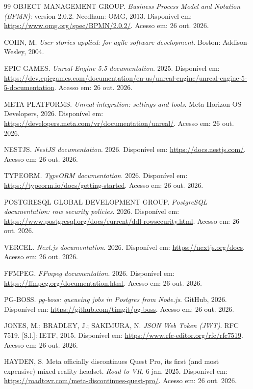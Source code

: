 \documentclass[conference,a4paper,10pt]{IEEEtran}
\begin{document}
\begin{thebibliography}{99}
 OBJECT MANAGEMENT GROUP. \textit{Business Process Model and Notation (BPMN)}: version 2.0.2. Needham: OMG, 2013. Disponível em: \url{https://www.omg.org/spec/BPMN/2.0.2/}. Acesso em: 26 out. 2026.

 COHN, M. \textit{User stories applied: for agile software development}. Boston: Addison-Wesley, 2004.

 EPIC GAMES. \textit{Unreal Engine 5.5 documentation}. 2025. Disponível em: \url{https://dev.epicgames.com/documentation/en-us/unreal-engine/unreal-engine-5-5-documentation}. Acesso em: 26 out. 2026.

 META PLATFORMS. \textit{Unreal integration: settings and tools}. Meta Horizon OS Developers, 2026. Disponível em: \url{https://developers.meta.com/vr/documentation/unreal/}. Acesso em: 26 out. 2026.

 NESTJS. \textit{NestJS documentation}. 2026. Disponível em: \url{https://docs.nestjs.com/}. Acesso em: 26 out. 2026.

 TYPEORM. \textit{TypeORM documentation}. 2026. Disponível em: \url{https://typeorm.io/docs/getting-started}. Acesso em: 26 out. 2026.

 POSTGRESQL GLOBAL DEVELOPMENT GROUP. \textit{PostgreSQL documentation: row security policies}. 2026. Disponível em: \url{https://www.postgresql.org/docs/current/ddl-rowsecurity.html}. Acesso em: 26 out. 2026.

 VERCEL. \textit{Next.js documentation}. 2026. Disponível em: \url{https://nextjs.org/docs}. Acesso em: 26 out. 2026.

 FFMPEG. \textit{FFmpeg documentation}. 2026. Disponível em: \url{https://ffmpeg.org/documentation.html}. Acesso em: 26 out. 2026.

 PG-BOSS. \textit{pg-boss: queueing jobs in Postgres from Node.js}. GitHub, 2026. Disponível em: \url{https://github.com/timgit/pg-boss}. Acesso em: 26 out. 2026.

 JONES, M.; BRADLEY, J.; SAKIMURA, N. \textit{JSON Web Token (JWT)}. RFC 7519. [S.l.]: IETF, 2015. Disponível em: \url{https://www.rfc-editor.org/rfc/rfc7519}. Acesso em: 26 out. 2026.

 HAYDEN, S. Meta officially discontinues Quest Pro, its first (and most expensive) mixed reality headset. \textit{Road to VR}, 6 jan. 2025. Disponível em: \url{https://roadtovr.com/meta-discontinues-quest-pro/}. Acesso em: 26 out. 2026.

\end{thebibliography}
\end{document}
